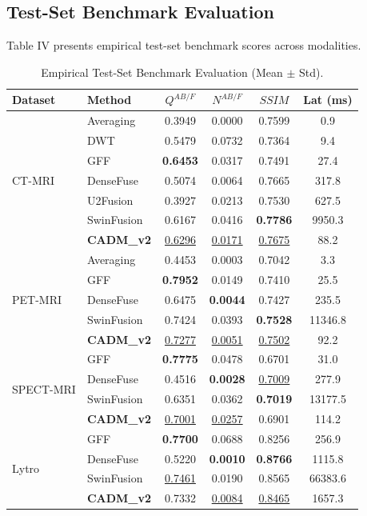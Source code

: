 \documentclass[conference]{IEEEtran}
\begin{document}
\subsection{Test-Set Benchmark Evaluation}
Table IV presents empirical test-set benchmark scores across modalities.

\begin{table}[htbp]
\caption{Empirical Test-Set Benchmark Evaluation (Mean $\pm$ Std).}
\begin{center}
\begin{tabular}{llcccc}
\toprule
\textbf{Dataset} & \textbf{Method} & $Q^{AB/F}$ & $N^{AB/F}$ & $SSIM$ & \textbf{Lat (ms)} \\
\midrule
\multirow{7}{*}{CT-MRI} 
& Averaging & 0.3949 & 0.0000 & 0.7599 & 0.9 \\
& DWT & 0.5479 & 0.0732 & 0.7364 & 9.4 \\
& GFF & \textbf{0.6453} & 0.0317 & 0.7491 & 27.4 \\
& DenseFuse & 0.5074 & 0.0064 & 0.7665 & 317.8 \\
& U2Fusion & 0.3927 & 0.0213 & 0.7530 & 627.5 \\
& SwinFusion & 0.6167 & 0.0416 & \textbf{0.7786} & 9950.3 \\
& \textbf{CADM\_v2} & \underline{0.6296} & \underline{0.0171} & \underline{0.7675} & 88.2 \\
\midrule
\multirow{5}{*}{PET-MRI}
& Averaging & 0.4453 & 0.0003 & 0.7042 & 3.3 \\
& GFF & \textbf{0.7952} & 0.0149 & 0.7410 & 25.5 \\
& DenseFuse & 0.6475 & \textbf{0.0044} & 0.7427 & 235.5 \\
& SwinFusion & 0.7424 & 0.0393 & \textbf{0.7528} & 11346.8 \\
& \textbf{CADM\_v2} & \underline{0.7277} & \underline{0.0051} & \underline{0.7502} & 92.2 \\
\midrule
\multirow{4}{*}{SPECT-MRI}
& GFF & \textbf{0.7775} & 0.0478 & 0.6701 & 31.0 \\
& DenseFuse & 0.4516 & \textbf{0.0028} & \underline{0.7009} & 277.9 \\
& SwinFusion & 0.6351 & 0.0362 & \textbf{0.7019} & 13177.5 \\
& \textbf{CADM\_v2} & \underline{0.7001} & \underline{0.0257} & 0.6901 & 114.2 \\
\midrule
\multirow{4}{*}{Lytro}
& GFF & \textbf{0.7700} & 0.0688 & 0.8256 & 256.9 \\
& DenseFuse & 0.5220 & \textbf{0.0010} & \textbf{0.8766} & 1115.8 \\
& SwinFusion & \underline{0.7461} & 0.0190 & 0.8565 & 66383.6 \\
& \textbf{CADM\_v2} & 0.7332 & \underline{0.0084} & \underline{0.8465} & 1657.3 \\
\bottomrule
\end{tabular}
\end{center}
\end{table}
\end{document}
